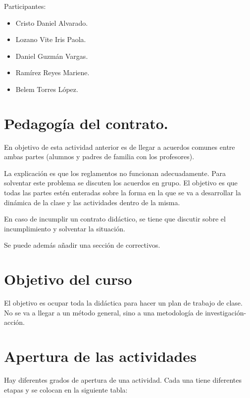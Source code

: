 \documentclass[12pt]{report}
\newcounter{it}
\theoremstyle{largebreak}
\begin{document}
    Participantes:

    \begin{itemize}
        \item Cristo Daniel Alvarado.
        \item Lozano Vite Iris Paola.
        \item Daniel Guzmán Vargas.
        \item Ramírez Reyes Mariene.
        \item Belem Torres López.
    \end{itemize}


    \section{Pedagogía del contrato.}

    En objetivo de esta actividad anterior es de llegar a acuerdos comunes entre ambas partes (alumnos y padres de familia con los profesores).

    La explicación es que los reglamentos no funcionan adecuadamente. Para solventar este problema se discuten los acuerdos en grupo. El objetivo es que todas las partes estén enteradas sobre la forma en la que se va a desarrollar la dinámica de la clase y las actividades dentro de la misma.

    \begin{obs}
        En caso de incumplir un contrato didáctico, se tiene que discutir sobre el incumplimiento y solventar la situación.
    \end{obs}

    Se puede además añadir una sección de correctivos.

    \newpage

    \section{Objetivo del curso}

    El objetivo es ocupar toda la didáctica para hacer un plan de trabajo de clase. No se va a llegar a un método general, sino a una metodología de investigación-acción.

    \section{Apertura de las actividades}

    Hay diferentes grados de apertura de una actividad. Cada una tiene diferentes etapas y se colocan en la siguiente tabla:
\end{document}
